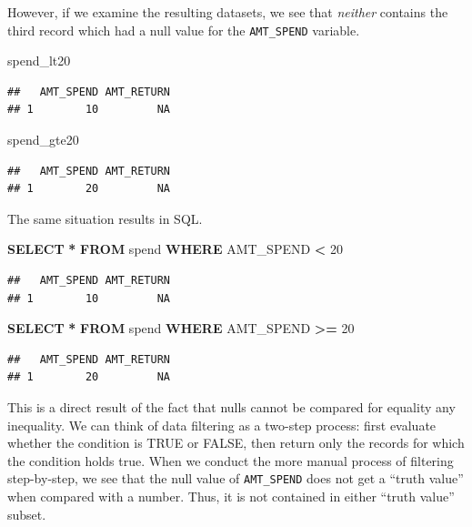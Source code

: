 \documentclass[
]{krantz}
\makeatletter
\newenvironment{Shaded}{\begin{snugshade}}{\end{snugshade}}
\newcommand{\DecValTok}[1]{\textcolor[rgb]{0.06,0.06,0.06}{#1}}
\newcommand{\KeywordTok}[1]{\textcolor[rgb]{0.27,0.27,0.27}{\textbf{#1}}}
\newcommand{\NormalTok}[1]{#1}
\newcommand{\OperatorTok}[1]{\textcolor[rgb]{0.43,0.43,0.43}{\textbf{#1}}}
\newenvironment{kframe}{%
\medskip{}
\setlength{\fboxsep}{.8em}
 \def\at@end@of@kframe{}%
 \ifinner\ifhmode%
  \def\at@end@of@kframe{\end{minipage}}%
  \begin{minipage}{\columnwidth}%
 \fi\fi%
 \def\FrameCommand##1{\hskip\@totalleftmargin \hskip-\fboxsep
 \colorbox{shadecolor}{##1}\hskip-\fboxsep
     \hskip-\linewidth \hskip-\@totalleftmargin \hskip\columnwidth}%
 \MakeFramed {\advance\hsize-\width
   \@totalleftmargin\z@ \linewidth\hsize
   \@setminipage}}%
 {\par\unskip\endMakeFramed%
 \at@end@of@kframe}
\renewenvironment{Shaded}{\begin{kframe}}{\end{kframe}}
\makeatother
\begin{document}
However, if we examine the resulting datasets, we see that \emph{neither} contains the third record which had a null value for the \texttt{AMT\_SPEND} variable.

\begin{Shaded}
\begin{Highlighting}[]
\NormalTok{spend\_lt20}
\end{Highlighting}
\end{Shaded}

\begin{verbatim}
##   AMT_SPEND AMT_RETURN
## 1        10         NA
\end{verbatim}

\begin{Shaded}
\begin{Highlighting}[]
\NormalTok{spend\_gte20}
\end{Highlighting}
\end{Shaded}

\begin{verbatim}
##   AMT_SPEND AMT_RETURN
## 1        20         NA
\end{verbatim}

The same situation results in SQL.

\begin{Shaded}
\begin{Highlighting}[]
\KeywordTok{SELECT} \OperatorTok{*}
\KeywordTok{FROM}\NormalTok{ spend}
\KeywordTok{WHERE}\NormalTok{ AMT\_SPEND }\OperatorTok{\textless{}} \DecValTok{20}
\end{Highlighting}
\end{Shaded}

\begin{verbatim}
##   AMT_SPEND AMT_RETURN
## 1        10         NA
\end{verbatim}

\begin{Shaded}
\begin{Highlighting}[]
\KeywordTok{SELECT} \OperatorTok{*}
\KeywordTok{FROM}\NormalTok{ spend}
\KeywordTok{WHERE}\NormalTok{ AMT\_SPEND }\OperatorTok{\textgreater{}=} \DecValTok{20}
\end{Highlighting}
\end{Shaded}

\begin{verbatim}
##   AMT_SPEND AMT_RETURN
## 1        20         NA
\end{verbatim}

This is a direct result of the fact that nulls cannot be compared for equality any inequality.
We can think of data filtering as a two-step process:
first evaluate whether the condition is TRUE or FALSE,
then return only the records for which the condition holds true.
When we conduct the more manual process of filtering step-by-step, we see that the null value of \texttt{AMT\_SPEND} does not get a ``truth value'' when compared with a number.
Thus, it is not contained in either ``truth value'' subset.
\end{document}
